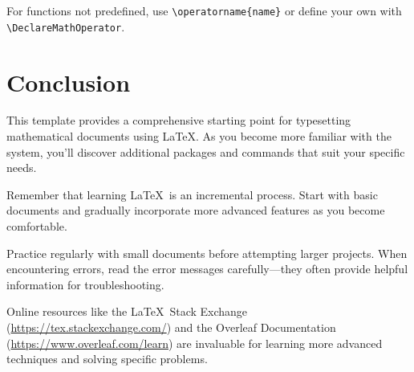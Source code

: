 \documentclass[11pt,a4paper]{article}
\begin{document}
For functions not predefined, use \verb|\operatorname{name}| or define your own with \verb|\DeclareMathOperator|.

\section{Conclusion}

This template provides a comprehensive starting point for typesetting mathematical documents using \LaTeX. As you become more familiar with the system, you'll discover additional packages and commands that suit your specific needs.

Remember that learning \LaTeX\ is an incremental process. Start with basic documents and gradually incorporate more advanced features as you become comfortable.

\begin{tipbox}
Practice regularly with small documents before attempting larger projects. When encountering errors, read the error messages carefully—they often provide helpful information for troubleshooting.
\end{tipbox}

\begin{notebox}
Online resources like the \LaTeX\ Stack Exchange (\url{https://tex.stackexchange.com/}) and the Overleaf Documentation (\url{https://www.overleaf.com/learn}) are invaluable for learning more advanced techniques and solving specific problems.
\end{notebox}

\end{document}
